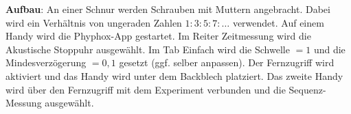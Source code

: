 \documentclass[../main.tex]{subfiles}
\begin{document}
\begin{tcolorbox}
\begin{minipage}[]{0.75\textwidth}
        \vspace{0.5cm}
        \textbf{Aufbau}: An einer Schnur werden Schrauben mit Muttern angebracht. Dabei wird ein Verhältnis von ungeraden Zahlen $1:3:5:7:\ldots$ verwendet. Auf einem Handy wird die Phyphox-App gestartet. Im Reiter \glqq Zeitmessung\grqq{} wird die \glqq Akustische Stoppuhr \grqq{} ausgewählt. Im Tab \glqq Einfach\grqq{} wird die Schwelle $=1$ und die Mindesverzögerung $=0,1$ gesetzt (ggf. selber anpassen). Der Fernzugriff wird aktiviert und das Handy wird unter dem Backblech platziert. Das zweite Handy wird über den Fernzugriff mit dem Experiment verbunden und die \glqq Sequenz\grqq{}-Messung ausgewählt.
    \end{minipage}
    \hspace{0.5cm}
    \begin{minipage}[]{0.2\textwidth}

\end{minipage}
\end{tcolorbox}
\end{document}
